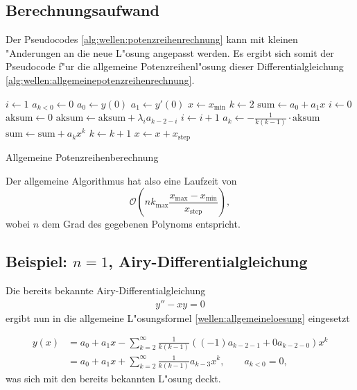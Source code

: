 \subsection{Berechnungsaufwand}
Der Pseudocodes \ref{alg:wellen:potenzreihenrechnung} kann mit kleinen 
"Anderungen an die neue L"osung angepasst werden. Es ergibt sich somit der 
Pseudocode f"ur die allgemeine Potenzreihenl"osung dieser Differentialgleichung 
\ref{alg:wellen:allgemeinepotenzreihenrechnung}.

\begin{algorithm}
	\begin{algorithmic}[1]
		\State $i \gets 1$
		\State $a_{k<0} \gets 0$
		\State $a_0 \gets y(0)$
		\State $a_1 \gets y'(0)$
		\State $x \gets x_{\text{min}}$
			\State $k \gets 2$
			\State $\text{sum} \gets a_0 + a_1x$
				\State $i \gets 0$
				\State $\text{aksum} \gets 0$
					\State $\text{aksum} \gets \text{aksum}+\lambda_i a_{k-2-i}$
					\State $i \gets i + 1$
				\EndFor
				\State $a_k \gets -\frac{1}{k(k-1)} \cdot \text{aksum}$
				\State $\text{sum} \gets \text{sum} + a_k x^k$
				\State $k \gets k + 1$
			\EndFor
			\State $x \gets x + x_{\text{step}}$
		\EndFor
	\end{algorithmic}
	\caption{Allgemeine Potenzreihenberechnung} 
	\label{alg:wellen:allgemeinepotenzreihenrechnung}
\end{algorithm}

Der allgemeine Algorithmus hat also eine Laufzeit von
\begin{equation*}
\mathcal{O}\left(nk_{\text{max}}\frac{x_{\text{max}}-x_{\text{min}}} 
{x_{\text{step}}}\right),
\end{equation*}
wobei $n$ dem Grad des gegebenen Polynoms entspricht.

\subsection{Beispiel: $n = 1$, Airy-Differentialgleichung}
Die bereits bekannte Airy-Differentialgleichung
\begin{align*}
	y''-xy = 0
\end{align*}
ergibt nun in die allgemeine L"osungsformel \ref{wellen:allgemeineloesung} 
eingesetzt

\begin{equation*}
\begin{split}
	y(x) &= a_0+a_1x-\sum_{k=2}^{\infty} \frac{1}{k(k-1)} ((-1) a_{k-2-1} + 0 
	a_{k-2-0}) x^k
	\\
	&= a_0+a_1x+\sum_{k=2}^{\infty} \frac{1}{k(k-1)} a_{k-3} x^k,
	\qquad a_{k < 0} = 0,
\end{split}
\end{equation*}
was sich mit den bereits bekannten L"osung deckt.

